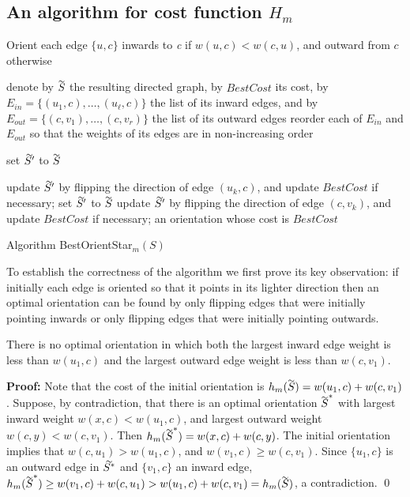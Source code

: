  \subsection{An algorithm for cost function $H_m$}
 \begin{algorithm}\label{a.starm}
 	
Orient each edge $\{u,c\}$ inwards to \textit{c} if $w(u,c)<w(c,u)$,
and outward from $c$ otherwise\; \label{i0}
 	 
denote by $\tildeb{S}$ the resulting directed graph, by $BestCost$ its cost, 
by $E_{in}=\{(u_1,c),\ldots, (u_{\ell},c)\}$ the list of its inward edges, 
and by $E_{out}=\{(c,v_1),\ldots, (c,v_r)\}$ the list of its outward edges\;
\label{i00} reorder each of $E_{in}$ and $E_{out}$ so that
the weights of its edges are in non-increasing order\;

set $\tildeb{S'}$ to $\tildeb{S}$\;

  {update $\tildeb{S'}$ by flipping the direction of edge $(u_k,c)$, and update $BestCost$ if necessary;}
   \label{i1} 
set $\tildeb{S'}$ to $\tildeb{S}$\;
   {update $\tildeb{S'}$ by flipping the direction of edge $(c,v_k)$, and update $BestCost$ if necessary;}
  \label{i2}
 	\Return an orientation whose cost is $BestCost$\;
 	\caption{Algorithm BestOrientStar$_m (S)$}
 	\label{algo:os-s}
 \end{algorithm}

\bigskip

To establish the correctness of the algorithm we first prove its key observation:  
if initially  each edge is oriented
so that it points in its lighter direction then an optimal orientation can be
found by only flipping edges that were initially pointing inwards or only
flipping edges that were initially pointing outwards. 
\begin{lemma}\label{l.best}
	There is no optimal orientation in which both the largest inward edge weight is less than $w(u_1,c)$ 
	and the largest outward edge weight is less than $w(c,v_1)$.
\end{lemma}

\noindent \textbf{Proof:}
Note that the cost of the initial orientation is $h_m(\tildeb{S})=w(u_1,c)+w(c,v_1)$.
Suppose, by contradiction, that there is an optimal orientation $\tildeb{S}^*$ 
with largest inward weight $w(x,c)< w(u_1,c)$,
and largest outward weight $w(c,y)<w(c,v_1)$.
Then $h_m(\tildeb{S}^*)=w(x,c)+w(c,y)$.
The initial orientation implies that $w(c,u_1) > w(u_1,c)$, and $w(v_1,c) \geq w(c,v_1)$.
Since $\{u_1,c\}$ is an outward edge in $\tildeb{S^*}$ and $\{v_1,c\}$ an inward edge,
$h_m(\tildeb{S}^*)\geq  
w(v_1,c)+w(c,u_1) >  w(u_1,c)+w(c,v_1) =h_m(\tildeb{S})$, a contradiction.
\qed

